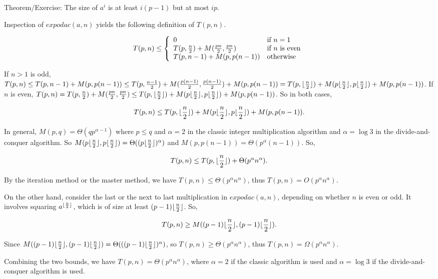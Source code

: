 \documentclass{article}
\begin{document}
\begin{itemize}
Theorem/Exercise: The size of $a^i$ is at least $i(p-1)$ but at most $ip$.

Inspection of $expodac(a,n)$ yields the following definition of $T(p,n)$.

$$T(p,n)\le\left\{\begin{array}{ll}
0 & \mbox{if $n=1$}\\
T(p,{n\over2})+M({pn\over2},{pn\over2}) & \mbox{if $n$ is even}\\
T(p,n-1)+M(p,p(n-1)) & \mbox{otherwise}
\end{array}\right.$$

If $n>1$ is odd, $T(p,n)\le T(p,n-1)+M(p,p(n-1))\le
T(p,{n-1\over2})+M({p(n-1)\over2},{p(n-1)\over2})+M(p,p(n-1))
=T(p,\lfloor{n\over2}\rfloor)+M(p\lfloor{n\over2}\rfloor,
p\lfloor{n\over2}\rfloor)+M(p,p(n-1))$. If $n$ is even,
$T(p,n)=T(p,{n\over2})+M({pn\over2},{pn\over2})
\le T(p,\lfloor{n\over2}\rfloor)+M(p\lfloor{n\over2}\rfloor,
p\lfloor{n\over2}\rfloor)+M(p,p(n-1))$. So in both cases,

$$T(p,n)\le T(p,\lfloor{n\over2}\rfloor)+M(p\lfloor{n\over2}\rfloor,
p\lfloor{n\over2}\rfloor)+M(p,p(n-1)).$$

In general, $M(p,q)=\Theta(qp^{\alpha-1})$ where $p\le q$ and
$\alpha=2$ in the classic integer multiplication algorithm and $\alpha=\log 3$ in the
divide-and-conquer algorithm. So $M(p\lfloor{n\over2}\rfloor,
p\lfloor{n\over2}\rfloor)=\Theta((p\lfloor{n\over2}\rfloor)^{\alpha})$
and $M(p,p(n-1))=\Theta(p^{\alpha}(n-1))$. So,

$$T(p,n)\le T(p,\lfloor{n\over2}\rfloor)+\Theta(p^{\alpha}n^{\alpha}).$$

By the iteration method or the master method, we have
$T(p,n)\le \Theta(p^{\alpha}n^{\alpha})$, thus
$T(p,n)=O(p^{\alpha}n^{\alpha})$.

On the other hand, consider the last or the next to last multiplication
in $expodac(a,n)$, depending on whether $n$ is even or odd. It involves
squaring $a^{\lfloor{n\over2}\rfloor}$, which is of size at least
$(p-1)\lfloor{n\over2}\rfloor$. So,

$$T(p,n)\ge M((p-1)\lfloor{n\over2}\rfloor,(p-1)\lfloor{n\over2}\rfloor).$$

Since $M((p-1)\lfloor{n\over2}\rfloor,(p-1)\lfloor{n\over2}\rfloor)
=\Theta(((p-1)\lfloor{n\over2}\rfloor)^{\alpha})$, so
$T(p,n)\ge\Theta(p^{\alpha}n^{\alpha})$, thus
$T(p,n)=\Omega(p^{\alpha}n^{\alpha})$.

Combining the two bounds, we have $T(p,n)=\Theta(p^{\alpha}n^{\alpha})$,
where $\alpha=2$ if the classic algorithm is used and $\alpha=\log 3$
if the divide-and-conquer algorithm is used.

\end{itemize}
\end{document}
